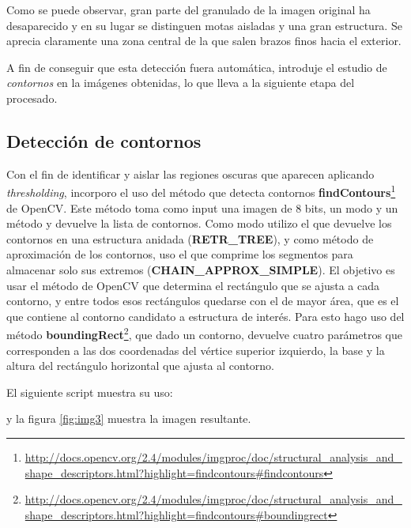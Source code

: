 \documentclass[a4paper,12pt]{article}
\begin{document}
Como se puede observar, gran parte del granulado de la imagen original ha desaparecido y en su lugar se distinguen motas aisladas y una gran estructura. Se aprecia claramente una zona central de la que salen brazos finos hacia el exterior.

A fin de conseguir que esta detección fuera automática, introduje el estudio de \textit{contornos} en la imágenes obtenidas, lo que lleva a la siguiente etapa del procesado.

\subsection{Detección de contornos}
Con el fin de identificar y aislar las regiones oscuras que aparecen aplicando \textit{thresholding}, incorporo el uso del método que detecta contornos \textbf{findContours}\footnote{\url{http://docs.opencv.org/2.4/modules/imgproc/doc/structural_analysis_and_shape_descriptors.html?highlight=findcontours#findcontours}} de OpenCV. Este método toma como input una imagen de 8 bits, un modo y un método y devuelve la lista de contornos. Como modo utilizo el que devuelve los contornos en una estructura anidada (\textbf{RETR\_TREE}), y como método de aproximación de los contornos, uso el que comprime los segmentos para almacenar solo sus extremos (\textbf{CHAIN\_APPROX\_SIMPLE}). El objetivo es usar el método de OpenCV que determina el rectángulo que se ajusta a cada contorno, y entre todos esos rectángulos quedarse con el de mayor área, que es el que contiene al contorno candidato a estructura de interés. Para esto hago uso del método \textbf{boundingRect}\footnote{\url{http://docs.opencv.org/2.4/modules/imgproc/doc/structural_analysis_and_shape_descriptors.html?highlight=findcontours#boundingrect}}, que dado un contorno, devuelve cuatro parámetros que corresponden a las dos coordenadas del vértice superior izquierdo, la base y la altura del rectángulo horizontal que ajusta al contorno.


El siguiente script muestra su uso:

y la figura \ref{fig:img3} muestra la imagen resultante.
\end{document}

